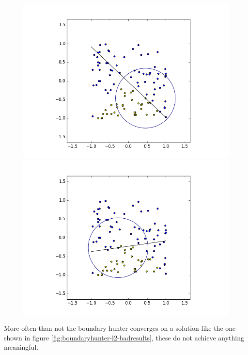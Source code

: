 \documentclass[notitlepage]{report}
\theoremstyle{definition}
\begin{document}
\begin{figure}[H]
  \centering
  \begin{minipage}[b]{0.4\textwidth}
    \includegraphics[width=\textwidth]{BoundaryHunter-Attempt3-R0.png}
    \caption{}
    \label{fig:boundaryhunter-l2-good1}
  \end{minipage}
  \hfill
  \begin{minipage}[b]{0.4\textwidth}
    \includegraphics[width=\textwidth]{BoundaryHunter-Attempt3-R1.png}
    \caption{}
    \label{fig:boundaryhunter-l2-good2}
  \end{minipage}
  \hfill
\end{figure}

More often than not the boundary hunter converges on a solution like the one shown in figure \ref{fig:boundaryhunter-l2-badresults}, these do not achieve anything meaningful.
\end{document}
